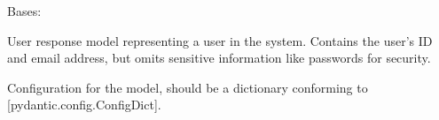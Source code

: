 \documentclass[letterpaper,10pt,openany,oneside,english]{sphinxmanual}
\begin{document}
\begin{savenotes}\begin{fulllineitems}

\pysigstartsignatures
{}
\pysigstopsignatures
\sphinxAtStartPar
Bases: 

\sphinxAtStartPar
User response model representing a user in the system.
Contains the user’s ID and email address, but omits sensitive information
like passwords for security.


\begin{savenotes}\begin{fulllineitems}

\pysigstartsignatures
{}
\pysigstopsignatures
\end{fulllineitems}\end{savenotes}



\begin{savenotes}\begin{fulllineitems}

\pysigstartsignatures
{}
\pysigstopsignatures
\end{fulllineitems}\end{savenotes}



\begin{savenotes}\begin{fulllineitems}

\pysigstartsignatures
{}
\pysigstopsignatures
\sphinxAtStartPar
Configuration for the model, should be a dictionary conforming to {[}\sphinxtitleref{ConfigDict}{]}{[}pydantic.config.ConfigDict{]}.

\end{fulllineitems}\end{savenotes}


\end{fulllineitems}\end{savenotes}
\end{document}
